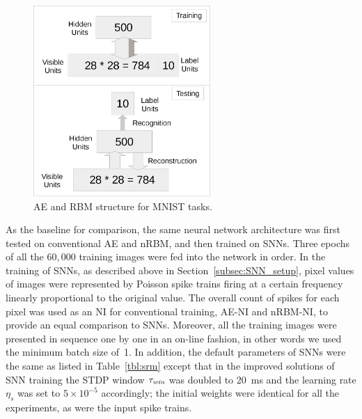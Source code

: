 \begin{figure}
	\centering
	\includegraphics[width=0.6\textwidth]{pics_sdlm/mnist.png}
	\caption{AE and RBM structure for MNIST tasks.}
	\label{fig:MNSIT}
\end{figure}

As the baseline for comparison, the same neural network architecture was first tested on conventional AE and nRBM, and then trained on SNNs.
Three epochs of all the $60,000$ training images were fed into the network in order.
In the training of SNNs, as described above in Section~\ref{subsec:SNN_setup}, pixel values of images were represented by Poisson spike trains firing at a certain frequency linearly proportional to the original value.
The overall count of spikes for each pixel was used as an NI for conventional training, AE-NI and nRBM-NI, to provide an equal comparison to SNNs.
Moreover, all the training images were presented in sequence one by one in an on-line fashion, in other words we used the minimum batch size of~1.
In addition, the default parameters of SNNs were the same as listed in Table~\ref{tbl:srm} except that in the improved solutions of SNN training the STDP window $\tau_\textit{\textrm{win}}$ was doubled to 20~ms and the learning rate $\eta_s$ was set to $5 \times 10^{-5}$ accordingly;
the initial weights were identical for all the experiments, as were the input spike trains.


